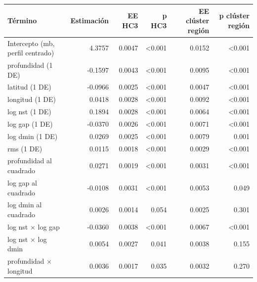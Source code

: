 \begin{tabular}{lrrrrr}
\toprule
Término & Estimación & EE HC3 & p HC3 & EE clúster región & p clúster región \\
\midrule
Intercepto (mb, perfil centrado) & 4.3757 & 0.0047 & <0.001 & 0.0152 & <0.001 \\
profundidad (1 DE) & -0.1597 & 0.0043 & <0.001 & 0.0095 & <0.001 \\
latitud (1 DE) & -0.0966 & 0.0025 & <0.001 & 0.0047 & <0.001 \\
longitud (1 DE) & 0.0418 & 0.0028 & <0.001 & 0.0092 & <0.001 \\
log nst (1 DE) & 0.1894 & 0.0028 & <0.001 & 0.0064 & <0.001 \\
log gap (1 DE) & -0.0370 & 0.0026 & <0.001 & 0.0071 & <0.001 \\
log dmin (1 DE) & 0.0269 & 0.0025 & <0.001 & 0.0079 & 0.001 \\
rms (1 DE) & 0.0115 & 0.0018 & <0.001 & 0.0029 & <0.001 \\
profundidad al cuadrado & 0.0271 & 0.0019 & <0.001 & 0.0031 & <0.001 \\
log gap al cuadrado & -0.0108 & 0.0031 & <0.001 & 0.0053 & 0.049 \\
log dmin al cuadrado & 0.0026 & 0.0014 & 0.054 & 0.0025 & 0.301 \\
log nst × log gap & -0.0360 & 0.0038 & <0.001 & 0.0067 & <0.001 \\
log nst × log dmin & 0.0054 & 0.0027 & 0.041 & 0.0038 & 0.155 \\
profundidad × longitud & 0.0036 & 0.0017 & 0.035 & 0.0032 & 0.270 \\
\bottomrule
\end{tabular}
